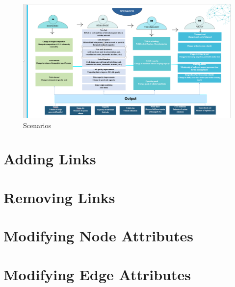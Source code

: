 \documentclass[
]{book}
\begin{document}
\begin{figure}
\centering
\includegraphics{"./Picture1.png"}
\caption{Scenarios}
\end{figure}

\hypertarget{adding-links}{%
\chapter{Adding Links}\label{adding-links}}

\hypertarget{removing-links}{%
\chapter{Removing Links}\label{removing-links}}

\hypertarget{modifying-node-attributes}{%
\chapter{Modifying Node Attributes}\label{modifying-node-attributes}}

\hypertarget{modifying-edge-attributes}{%
\chapter{Modifying Edge Attributes}\label{modifying-edge-attributes}}
\end{document}
